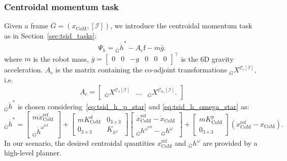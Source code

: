 \subsubsection{Centroidal momentum task}
Given a frame $\bar{G} = (x_\text{CoM},[\mathcal{I}])$, we introduce the centroidal momentum task as in Section~\ref{sec:tsid_tasks}:
\begin{equation}
    \label{eq:tsid_centroidal_momentum_joint_flex}
    \Psi_h = {}_{\bar{G}} \dot{{h}}^* - A_c \mathrm{f} - m\bar{g}.
\end{equation}
where $m$ is the robot mass, $\bar{g} = \begin{bmatrix} 0&0&-g&0&0&0 \end{bmatrix}^\top$ is the 6D gravity acceleration. $A_c$ is the matrix containing the co-adjoint transformations ${}_{\bar{G}} X^{\mathcal{C}_i[\mathcal{I}]}$, i.e.
\begin{equation}
    A_c = \begin{bmatrix}
    {}_{\bar{G}} X ^{\mathcal{C}_1[\mathcal{I}]} & \hdots & {}_{\bar{G}} X^{\mathcal{C}_{n_c}[\mathcal{I}]}.
    \end{bmatrix}
\end{equation}
${}_{\bar{G}} \dot{{h}}^*$ is chosen considering~\eqref{eq:tsid_h_p_star} and \eqref{eq:tsid_h_omega_star} as:
\begin{equation}
    \label{eq:tsid_h_star_flex_joints}
    {}_{\bar{G}} \dot{{h}}^* = 
    \begin{bmatrix}
    m  \ddot{x}^\text{ref}_\text{CoM} \\ 
    {}_{\bar{G}} \dot{{h}}^{\omega^\text{ref}} 
    \end{bmatrix} +
    \begin{bmatrix}
    m K^d_\text{CoM}& 0_{3\times3}\\
     0_{3\times3} & K_{h^\omega}
    \end{bmatrix}
    \begin{bmatrix}
    \dot{x}^\text{ref}_\text{CoM} - \dot{x}_\text{CoM} \\ 
    {}_{\bar{G}} {{h}}^{\omega^\text{ref}} - {}_{\bar{G}} {{h}}^{\omega}
\end{bmatrix} 
 +
    \begin{bmatrix}
    m K^p_\text{CoM} \\
     0_{3\times3} 
    \end{bmatrix}
\left({x}^\text{ref}_\text{CoM} - {x}_\text{CoM}\right).
\end{equation}
In our scenario, the desired centroidal quantities ${x}^\text{ref}_\text{CoM}$ and ${}_{\bar{G}} {{h}}^{\omega}$ are provided by a high-level planner.

